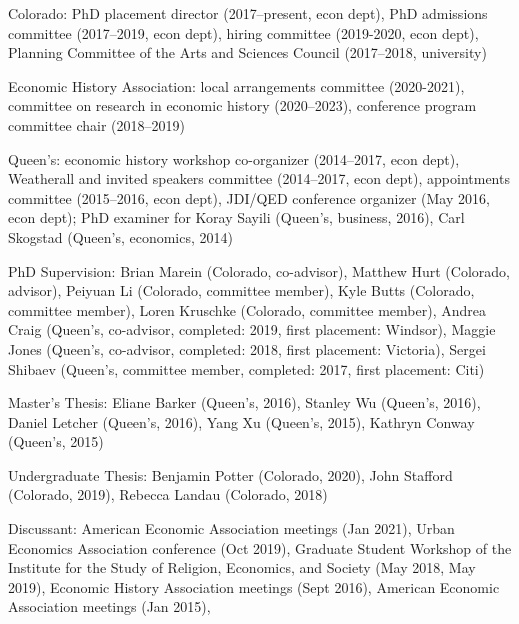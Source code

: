 \documentclass[11pt,letterpaper]{article}
\begin{document}
\begin{description}[leftmargin=0in,itemsep=.25em,itemindent=0in]

\item Colorado: PhD placement director (2017--present, econ dept), PhD admissions committee (2017--2019, econ dept), hiring committee (2019-2020, econ dept), Planning Committee of the Arts and Sciences Council (2017--2018, university) 

\item Economic History Association: local arrangements committee (2020-2021), committee on research in economic history (2020--2023), conference program committee chair (2018--2019)

\item Queen's: economic history workshop co-organizer (2014--2017, econ dept), Weatherall and invited speakers committee (2014--2017, econ dept), appointments committee (2015--2016, econ dept), JDI/QED conference organizer (May 2016, econ dept); PhD examiner for Koray Sayili (Queen's, business, 2016), Carl Skogstad (Queen's, economics, 2014)


\item PhD Supervision: Brian Marein (Colorado, co-advisor), Matthew Hurt (Colorado, advisor), Peiyuan Li (Colorado, committee member), Kyle Butts (Colorado, committee member), Loren Kruschke (Colorado, committee member),  Andrea Craig (Queen's, co-advisor, completed: 2019, first placement: Windsor), Maggie Jones (Queen's, co-advisor, completed: 2018, first placement:  Victoria), Sergei Shibaev (Queen's, committee member, completed: 2017, first placement: Citi)

\item Master's Thesis: Eliane Barker (Queen's, 2016),  Stanley Wu (Queen's, 2016), Daniel Letcher (Queen's, 2016), Yang Xu (Queen's, 2015), Kathryn Conway (Queen's, 2015)

\item Undergraduate Thesis: Benjamin Potter (Colorado, 2020), John Stafford (Colorado, 2019), Rebecca Landau (Colorado, 2018) %

\item Discussant: American Economic Association meetings (Jan 2021), Urban Economics Association conference (Oct 2019), Graduate Student Workshop of the Institute for the Study of Religion, Economics, and Society (May 2018, May 2019), Economic History Association meetings (Sept 2016), American Economic Association meetings (Jan 2015),


\end{description}
\end{document}
